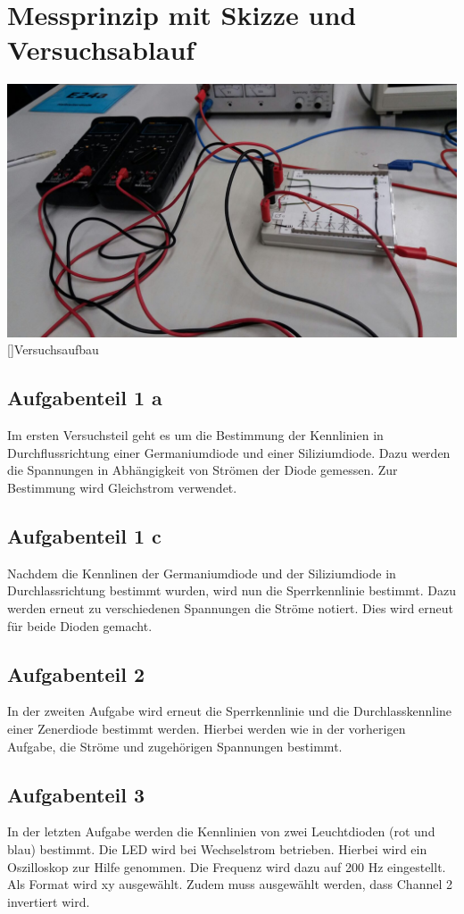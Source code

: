 \chapter{Messprinzip mit Skizze und Versuchsablauf}

   	\begin{center}
    
		\includegraphics[scale=0.25]{Daten/Aufbau.jpg}
		[]{Versuchsaufbau}
    \end{center}
     
        
	\section{Aufgabenteil 1 a}
Im ersten Versuchsteil geht es um die Bestimmung der Kennlinien in Durchflussrichtung einer Germaniumdiode und einer Siliziumdiode. Dazu werden die Spannungen in Abhängigkeit von Strömen der Diode gemessen. Zur Bestimmung wird Gleichstrom verwendet. 
 
         \section{Aufgabenteil 1 c}
         Nachdem die Kennlinen der Germaniumdiode und der Siliziumdiode in Durchlassrichtung bestimmt wurden, wird nun die Sperrkennlinie bestimmt. Dazu werden erneut zu verschiedenen Spannungen die Ströme notiert. Dies wird erneut für beide Dioden gemacht.
         
   \section{Aufgabenteil 2}

In der zweiten Aufgabe wird erneut die Sperrkennlinie und die Durchlasskennline einer Zenerdiode bestimmt werden. Hierbei werden wie in der vorherigen Aufgabe, die Ströme und zugehörigen Spannungen bestimmt.

\section{Aufgabenteil 3}

In der letzten Aufgabe werden die Kennlinien von  zwei Leuchtdioden (rot und blau) bestimmt. Die LED wird bei Wechselstrom betrieben. Hierbei wird ein Oszilloskop zur Hilfe genommen. Die Frequenz wird dazu auf 200 Hz eingestellt. Als Format wird xy ausgewählt. Zudem muss ausgewählt werden, dass Channel 2 invertiert wird.

\pagebreak